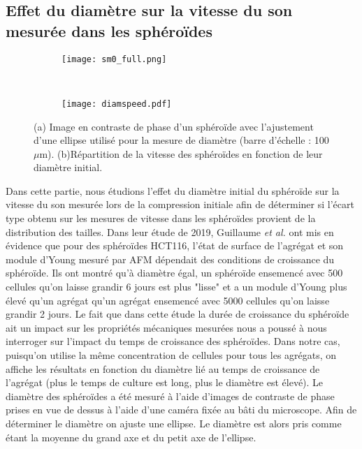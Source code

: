 \subsection{Effet du diamètre sur la vitesse du son mesurée dans les sphéroïdes}
\begin{figure}[tb!]
\begin{subfigure}[t]{0.49\textwidth}
\centering
\texttt{[image: sm0\_full.png]}
\caption{\label{diameter}}
\end{subfigure}
~~
\begin{subfigure}[t]{0.49\textwidth}
\centering
	\texttt{[image: diamspeed.pdf]}
	\caption{\label{diamspeed}}
 \end{subfigure}
 \caption{(a) Image en contraste de phase d'un sphéroïde avec l'ajustement d'une ellipse utilisé pour la mesure de diamètre (barre d'échelle : 100 $\mu$m). (b)Répartition de la vitesse des sphéroïdes en fonction de leur diamètre initial.}
\end{figure}
Dans cette partie, nous étudions l'effet du diamètre initial du sphéroïde sur la vitesse du son mesurée lors de la compression initiale afin de déterminer si l'écart type obtenu sur les mesures de vitesse dans les sphéroïdes provient de la distribution des tailles. Dans leur étude de 2019, Guillaume\textit{ et al.} ont mis en évidence que pour des sphéroïdes HCT116, l'état de surface de l'agrégat et son module d'Young mesuré par AFM dépendait des conditions de croissance du sphéroïde. Ils ont montré qu'à diamètre égal, un sphéroïde ensemencé avec 500 cellules qu'on laisse grandir 6 jours est plus "lisse" et a un module d'Young plus élevé qu'un agrégat qu'un agrégat ensemencé avec 5000 cellules qu'on laisse grandir 2 jours\cite{Guillaume2019}. Le fait que dans cette étude la durée de croissance du sphéroïde ait un impact sur les propriétés mécaniques mesurées nous a poussé à nous interroger sur l'impact du temps de croissance des sphéroïdes. Dans notre cas, puisqu'on utilise la même concentration de cellules pour tous les agrégats, on affiche les résultats en fonction du diamètre lié au temps de croissance de l'agrégat (plus le temps de culture est long, plus le diamètre est élevé).
Le diamètre des sphéroïdes a été mesuré à l'aide d'images de contraste de phase prises en vue de dessus à l'aide d'une caméra fixée au bâti du microscope.
Afin de déterminer le diamètre on ajuste une ellipse. Le diamètre est alors pris comme étant la moyenne du grand axe et du petit axe de l'ellipse.

